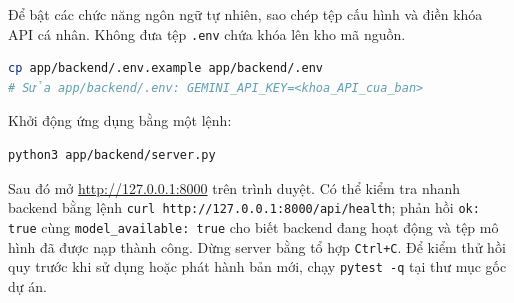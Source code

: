 Để bật các chức năng ngôn ngữ tự nhiên, sao chép tệp cấu hình và điền khóa API cá nhân. Không đưa tệp \texttt{.env} chứa khóa lên kho mã nguồn.

\begin{lstlisting}[language=bash,caption={Cấu hình tùy chọn cho Gemini API.}]
cp app/backend/.env.example app/backend/.env
# Sửa app/backend/.env: GEMINI_API_KEY=<khoa_API_cua_ban>
\end{lstlisting}

Khởi động ứng dụng bằng một lệnh:

\begin{lstlisting}[language=bash,caption={Chạy ứng dụng local.}]
python3 app/backend/server.py
\end{lstlisting}

Sau đó mở \url{http://127.0.0.1:8000} trên trình duyệt. Có thể kiểm tra nhanh backend bằng lệnh \texttt{curl http://127.0.0.1:8000/api/health}; phản hồi \texttt{ok: true} cùng \texttt{model\_available: true} cho biết backend đang hoạt động và tệp mô hình đã được nạp thành công. Dừng server bằng tổ hợp \texttt{Ctrl+C}. Để kiểm thử hồi quy trước khi sử dụng hoặc phát hành bản mới, chạy \texttt{pytest -q} tại thư mục gốc dự án.
